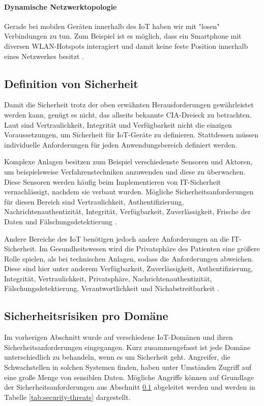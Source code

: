 \paragraph{Dynamische Netzwerktopologie}
Gerade bei mobilen Geräten innerhalb des IoT haben wir mit "losen" Verbindungen
zu tun. Zum Beispiel ist es möglich, dass ein Smartphone mit diversen
WLAN-Hotspots interagiert und damit keine feste Position innerhalb eines
Netzwerkes besitzt \cite{paper}.

\subsection{Definition von Sicherheit}\label{sec:def-security}
Damit die Sicherheit trotz der oben erwähnten Herausforderungen ge\-währ\-lei\-stet
werden kann, genügt es nicht, das allseits bekannte CIA-Dreieck zu betrachten.
Laut \cite{paper} sind Vertraulichkeit, Integrität und Verfügbarkeit nicht die
einzigen Voraussetzungen, um Sicherheit für IoT-Geräte zu definieren.
Stattdessen müssen individuelle Anforderungen für jeden Anwendungsbereich
definiert werden.

Komplexe Anlagen besitzen zum Beispiel verschiedenste Sensoren und Aktoren, um
beispielsweise Verfahrenstechniken anzuwenden und diese zu über\-wachen. Diese
Sensoren werden häufig beim Implementieren von IT-Sich\-er\-heit vernachlässigt,
nachdem sie verbaut wurden. Mögliche Sicherheitsanforderungen für
diesen Bereich sind Vertraulichkeit, Authentifizierung,
Nachrichtenauthentizität, Integrität, Verfügbarkeit, Zuverlässigkeit, Frische
der Daten und Fälschungsdetektierung \cite{paper}.

Andere Bereiche des IoT benötigen jedoch andere Anforderungen an die
IT-Sicherheit. Im Gesundheitswesen wird die Privatsphäre des Patienten eine
größere Rolle spielen, als bei technischen Anlagen, sodass die Anforderungen
abweichen. Diese sind hier unter anderem Verfügbarkeit, Zuverlässigkeit,
Authentifizierung, Integrität, Vertraulichkeit, Privatsphäre,
Nachrichtenauthentizität, Fälschungsdetektierung, Verantwortlichkeit und
Nichabstreitbarkeit \cite{paper}.

\subsection{Sicherheitsrisiken pro Domäne}
Im vorherigen Abschnitt wurde auf verschiedene IoT-Domänen und ihren
Sicherheitsanforderungen eingegangen. Kurz zusammengefasst ist jede Domäne
unterschiedlich zu behandeln, wenn es um Sicherheit geht. Angreifer, die
Schwachstellen in solchen Systemen finden, haben unter Umständen Zugriff auf
eine große Menge von sensiblen Daten. Mögliche Angriffe können auf Grundlage der
Sicherheitsanforderungen aus Abschnitt \ref{sec:def-security} abgeleitet werden
\cite{paper} und werden in Tabelle \ref{tab:security-threats} dargestellt.

